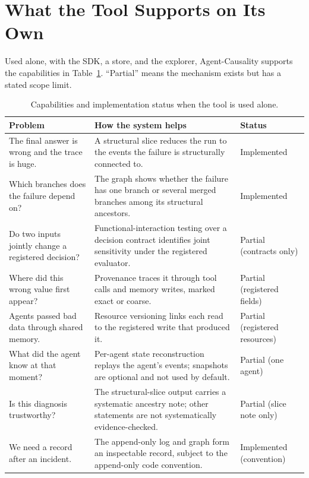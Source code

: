 \documentclass[11pt]{article}
\begin{document}
\section{What the Tool Supports on Its Own}\label{sec:alone}
Used alone, with the SDK, a store, and the explorer, Agent-Causality supports the capabilities in Table~\ref{tab:alone}. ``Partial'' means the mechanism exists but has a stated scope limit.

\begin{table}[h]
\centering\small
\begin{tabularx}{\linewidth}{@{}>{\raggedright\arraybackslash}p{4.8cm}>{\raggedright\arraybackslash}X>{\raggedright\arraybackslash}p{1.8cm}@{}}
\toprule
\textbf{Problem} & \textbf{How the system helps} & \textbf{Status}\\
\midrule
The final answer is wrong and the trace is huge. & A structural slice reduces the run to the events the failure is structurally connected to. & Implemented\\
Which branches does the failure depend on? & The graph shows whether the failure has one branch or several merged branches among its structural ancestors. & Implemented\\
Do two inputs jointly change a registered decision? & Functional-interaction testing over a decision contract identifies joint sensitivity under the registered evaluator. & Partial (contracts only)\\
Where did this wrong value first appear? & Provenance traces it through tool calls and memory writes, marked exact or coarse. & Partial (registered fields)\\
Agents passed bad data through shared memory. & Resource versioning links each read to the registered write that produced it. & Partial (registered resources)\\
What did the agent know at that moment? & Per-agent state reconstruction replays the agent's events; snapshots are optional and not used by default. & Partial (one agent)\\
Is this diagnosis trustworthy? & The structural-slice output carries a systematic ancestry note; other statements are not systematically evidence-checked. & Partial (slice note only)\\
We need a record after an incident. & The append-only log and graph form an inspectable record, subject to the append-only code convention. & Implemented (convention)\\
\bottomrule
\end{tabularx}
\caption{Capabilities and implementation status when the tool is used alone.}
\label{tab:alone}
\end{table}
\end{document}
